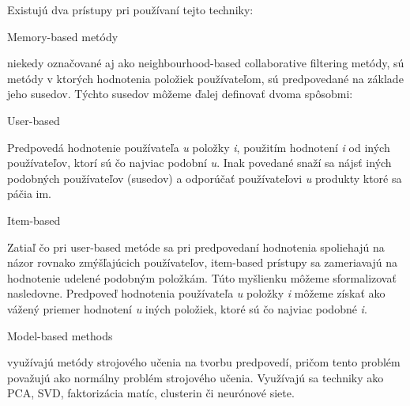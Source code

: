 Existujú dva prístupy pri používaní tejto techniky:
\begin{enumerate}
	{\bf \item Memory-based metódy} niekedy označované aj ako neighbourhood-based collaborative filtering metódy, sú metódy v ktorých hodnotenia položiek používateľom, sú predpovedané na základe jeho susedov. Týchto susedov môžeme ďalej definovať dvoma spôsobmi:
\begin{itemize}[leftmargin=*]
	{\bf \item User-based}\newline	
Predpovedá hodnotenie používateľa \textit{u} položky \textit{i}, použitím hodnotení \textit{i} od iných používateľov, ktorí sú čo najviac podobní \textit{u}. Inak povedané snaží sa nájsť iných podobných používateľov (susedov) a odporúčať používateľovi \textit{u} produkty ktoré sa páčia im.
	{\bf \item Item-based} \newline
Zatiaľ čo pri user-based metóde sa pri predpovedaní hodnotenia spoliehajú na názor rovnako zmýšľajúcich používateľov, item-based prístupy sa zameriavajú na hodnotenie udelené podobným položkám. Túto myšlienku môžeme sformalizovať nasledovne. Predpoveď hodnotenia používateľa \textit{u} položky \textit{i} môžeme získať ako vážený priemer hodnotení \textit{u} iných položiek, ktoré sú čo najviac podobné \textit{i}.
\end{itemize}
	{\bf \item Model-based methods} využívajú metódy strojového učenia na tvorbu predpovedí, pričom tento problém považujú ako normálny problém strojového učenia. Využívajú sa techniky ako PCA, SVD, faktorizácia matíc, clusterin či neurónové siete. \\
\end{enumerate}


